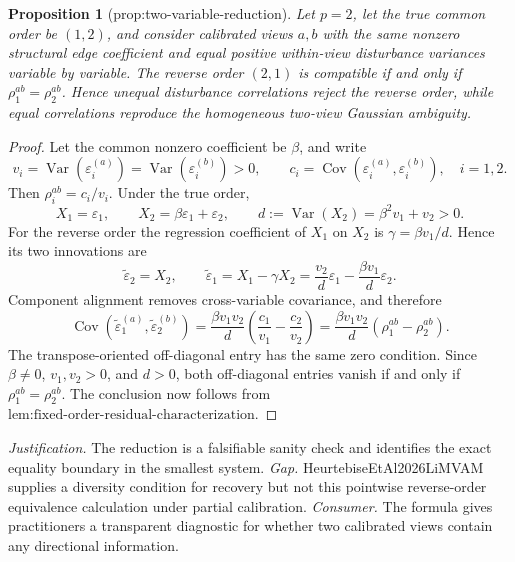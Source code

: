 \documentclass{article}
\newtheorem{proposition}{Proposition}
\begin{document}
\begin{proposition}[prop:two-variable-reduction]\label{prop:two-variable-reduction}
Let \(p=2\), let the true common order be \((1,2)\), and consider calibrated views \(a,b\) with the same nonzero structural edge coefficient and equal positive within-view disturbance variances variable by variable. The reverse order \((2,1)\) is compatible if and only if \(\rho_1^{ab}=\rho_2^{ab}\). Hence unequal disturbance correlations reject the reverse order, while equal correlations reproduce the homogeneous two-view Gaussian ambiguity.
\end{proposition}
\begin{proof}
Let the common nonzero coefficient be \(\beta\), and write
\[
v_i=\operatorname{Var}(\varepsilon_i^{(a)})=\operatorname{Var}(\varepsilon_i^{(b)})>0,\qquad
c_i=\operatorname{Cov}(\varepsilon_i^{(a)},\varepsilon_i^{(b)}),\quad i=1,2.
\]
Then \(\rho_i^{ab}=c_i/v_i\).  Under the true order,
\[
X_1=\varepsilon_1,\qquad X_2=\beta\varepsilon_1+\varepsilon_2,\qquad
d:=\operatorname{Var}(X_2)=\beta^2v_1+v_2>0.
\]
For the reverse order the regression coefficient of \(X_1\) on \(X_2\) is \(\gamma=\beta v_1/d\).  Hence its two innovations are
\[
\widetilde\varepsilon_2=X_2,\qquad
\widetilde\varepsilon_1=X_1-\gamma X_2=\frac{v_2}{d}\varepsilon_1-\frac{\beta v_1}{d}\varepsilon_2.
\]
Component alignment removes cross-variable covariance, and therefore
\[
\operatorname{Cov}\!\left(\widetilde\varepsilon_1^{(a)},\widetilde\varepsilon_2^{(b)}\right)
=\frac{\beta v_1v_2}{d}\left(\frac{c_1}{v_1}-\frac{c_2}{v_2}\right)
=\frac{\beta v_1v_2}{d}\left(\rho_1^{ab}-\rho_2^{ab}\right).
\]
The transpose-oriented off-diagonal entry has the same zero condition.  Since \(\beta\ne0\), \(v_1,v_2>0\), and \(d>0\), both off-diagonal entries vanish if and only if \(\rho_1^{ab}=\rho_2^{ab}\).  The conclusion now follows from \(\text{lem:fixed-order-residual-characterization}\).
\end{proof}
\par\smallskip\noindent \textit{Justification.} The reduction is a falsifiable sanity check and identifies the exact equality boundary in the smallest system. \textit{Gap.} HeurtebiseEtAl2026LiMVAM supplies a diversity condition for recovery but not this pointwise reverse-order equivalence calculation under partial calibration. \textit{Consumer.} The formula gives practitioners a transparent diagnostic for whether two calibrated views contain any directional information.
\end{document}
